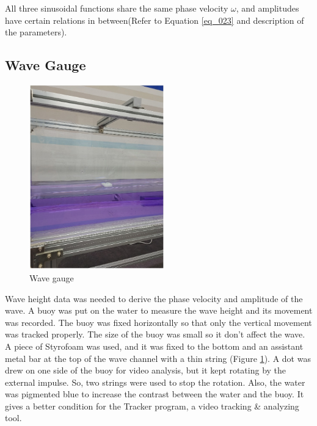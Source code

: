 All three sinusoidal functions share the same phase velocity $\omega$, and amplitudes have certain relations in between(Refer to Equation \ref{eq_023} and description of the parameters).

\subsection{Wave Gauge}%


\begin{figure}[H]
    \centering
    \includegraphics[height=8cm]{images/Wave_Gauge.jpg}
    \caption{Wave gauge}
    \label{Wave gauge}
\end{figure}

Wave height data was needed to derive the phase velocity and amplitude of the wave. A buoy was put on the water to measure the wave height and its movement was recorded. The buoy was fixed horizontally so that only the vertical movement was tracked properly. The size of the buoy was small so it don't affect the wave. A piece of Styrofoam was used, and it was fixed to the bottom and an assistant metal bar at the top of the wave channel with a thin string (Figure \ref{Wave gauge}). A dot was drew on one side of the buoy for video analysis, but it kept rotating by the external impulse. So, two strings were used to stop the rotation.
Also, the water was pigmented blue to increase the contrast between the water and the buoy. It gives a better condition for the Tracker program, a video tracking \& analyzing tool.

